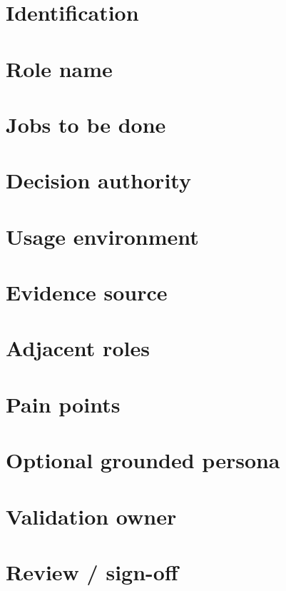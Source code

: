 \documentclass[11pt,letterpaper]{article}
\begin{document}
\section{Identification}
\section{Role name}
\section{Jobs to be done}
\section{Decision authority}
\section{Usage environment}
\section{Evidence source}
\clearpage
\section{Adjacent roles}
\section{Pain points}
\section{Optional grounded persona}
\section{Validation owner}
\clearpage
\section{Review / sign-off}
\end{document}
